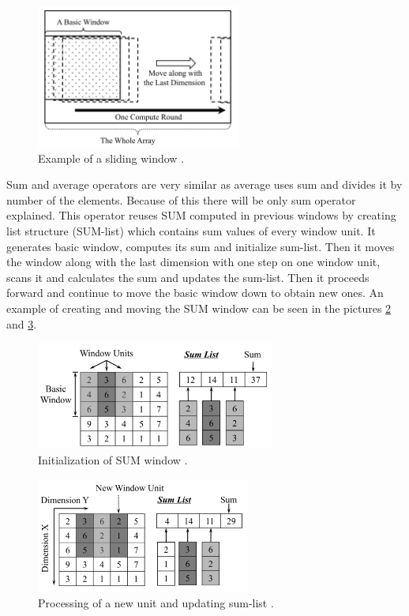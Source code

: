 \begin{figure}
\centering
\includegraphics[width=0.6\textwidth]{windowAM.PNG}
\caption{Example of a sliding window \cite{windowAggr}. }
\label{windowAMwin}
\end{figure}

Sum and average operators are very similar as average uses sum and divides it by number of the elements. Because of this there will be only sum operator explained. This operator reuses SUM computed in previous windows by creating list structure (SUM-list) which contains sum values of every window unit. It generates basic window, computes its sum and initialize sum-list. Then it moves the window along with the last dimension with one step on one window unit, scans it and calculates the sum and updates the sum-list. Then it proceeds forward and continue to move the basic window down to obtain new ones. An example of creating and moving the SUM window can be seen in the pictures \ref{windowAM1} and \ref{windowAM2}.

\begin{figure}
\centering
\includegraphics[width=0.7\textwidth]{windowAM_sum1.PNG}
\caption{Initialization of SUM window \cite{windowAggr}.}
\label{windowAM1}
\end{figure}

\begin{figure}
\centering
\includegraphics[width=0.63\textwidth]{windowAM_sum2.PNG}
\caption{Processing of a new unit and updating sum-list \cite{windowAggr}.}
\label{windowAM2}
\end{figure}

